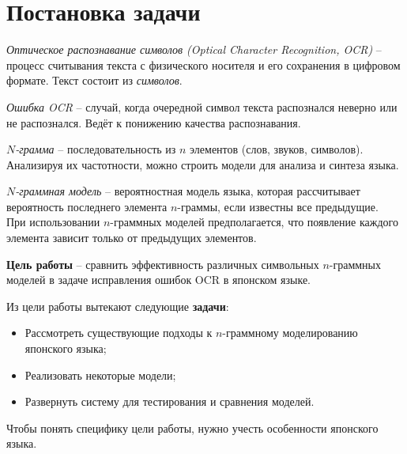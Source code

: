 
\section{ Постановка задачи }\label{sec:taskdef}

\begin{definition}{\textit{Оптическое распознавание символов (Optical Character Recognition, OCR)}} -- процесс считывания текста с физического носителя и его сохранения в цифровом формате. Текст состоит из \textit{символов}.
\end{definition}

\begin{definition}{\textit{Ошибка OCR}} -- случай, когда очередной символ текста распознался неверно или не распознался. Ведёт к понижению качества распознавания.
\end{definition}

\begin{definition}{\textit{$N$-грамма}} -- последовательность из $n$ элементов (слов, звуков, символов). Анализируя их частотности, можно строить модели для анализа и синтеза языка.
\end{definition}

\begin{definition}{\textit{$N$-граммная модель}} -- вероятностная модель языка, которая рассчитывает вероятность последнего элемента $n$-граммы, если известны все предыдущие. \\
При использовании $n$-граммных моделей предполагается, что появление каждого элемента зависит только от предыдущих элементов.
\end{definition}

\textbf{Цель работы} -- сравнить эффективность различных символьных $n$-граммных моделей в задаче исправления ошибок OCR в японском языке.

Из цели работы вытекают следующие \textbf{задачи}:
\begin{itemize}
	\item Рассмотреть существующие подходы к $n$-граммному моделированию японского языка;
	
	\item Реализовать некоторые модели;
	
	\item Развернуть систему для тестирования и сравнения моделей.
\end{itemize}

Чтобы понять специфику цели работы, нужно учесть особенности японского языка.

